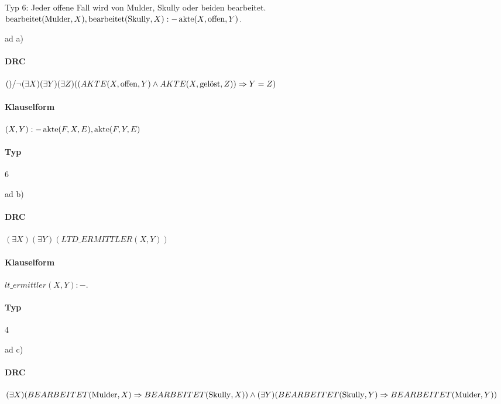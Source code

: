 \documentclass[12pt,a4paper]{amsart}
\begin{document}
Typ 6: Jeder offene Fall wird von Mulder, Skully oder beiden bearbeitet. \\
$\operatorname{bearbeitet}(\operatorname{Mulder},X),\operatorname{bearbeitet}(\operatorname{Skully},X):-\operatorname{akte}(X,\operatorname{offen},Y)$.


\bigskip

\begin{aufgabe1}
\end{aufgabe1}

ad a) \\

\paragraph{DRC}
$() / \lnot (\exists X)(\exists Y)(\exists Z) ((AKTE(X, \operatorname{offen}, Y) \wedge AKTE(X, \operatorname{gel\ddot{o}st}, Z)) \Rightarrow Y = Z)$ \\
\paragraph{Klauselform}
$(X, Y) :- \operatorname{akte}(F, X, E), \operatorname{akte}(F, Y, E)$ \\
\paragraph{Typ}
6 \\

\bigskip

ad b) \\

\paragraph{DRC}
$(\exists X)(\exists Y) (LTD\_ERMITTLER(X, Y))$ \\
\paragraph{Klauselform}
$lt\_ermittler(X, Y) :- .$\\
\paragraph{Typ}
4 \\

\bigskip

ad c) \\

\paragraph{DRC}
$(\exists X)(BEARBEITET(\operatorname{Mulder}, X) \Rightarrow BEARBEITET(\operatorname{Skully}, X)) \wedge (\exists Y)(BEARBEITET(\operatorname{Skully}, Y) \Rightarrow BEARBEITET(\operatorname{Mulder}, Y))$ \\
\end{document}

